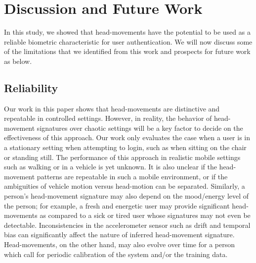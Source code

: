 \section{Discussion and Future Work}\label{sec:disc}

In this study, we showed that head-movements have the potential to be used as
a reliable biometric characteristic for user authentication.
We will now discuss some of the limitations that we identified from this work
and prospects for future work as below.

\subsection{Reliability}
Our work in this paper shows that head-movements are distinctive and
repeatable in controlled settings. However, in reality, the behavior of
head-movement signatures over chaotic settings will be a key factor to decide
on the effectiveness of this approach. Our work only evaluates the case when a
user is in a stationary setting when attempting to login, such as when sitting
on the chair or standing still. The performance of this approach in realistic
mobile settings such as walking or in a vehicle is yet unknown. It is also
unclear if the head-movement patterns are repeatable in such a mobile environment, or
if the ambiguities of vehicle motion versus head-motion can be separated. 
Similarly, a person's head-movement signature may also depend on the mood/energy level of
the person; for example, a fresh and energetic user may provide significant
head-movements as compared to a sick or tired user whose signatures may not
even be detectable. Inconsistencies in the accelerometer sensor such as drift and temporal bias can
significantly affect the nature of inferred head-movement signature.
Head-movements, on the other hand, may also evolve over time for a person
which call for periodic calibration of the system and/or the training data.

